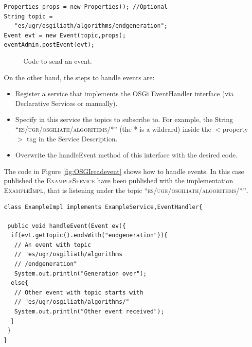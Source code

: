 \newsavebox{\mintedboxOSGIpostevent}
\begin{lrbox}{\mintedboxOSGIpostevent}
\begin{minipage}{10cm}
\begin{verbatim}
Properties props = new Properties(); //Optional
String topic = 
   "es/ugr/osgiliath/algorithms/endgeneration";
Event evt = new Event(topic,props);
eventAdmin.postEvent(evt);
\end{verbatim}
\end{minipage}
\end{lrbox}

\begin{figure}
\usebox{\mintedboxOSGIpostevent}
\caption{Code to send an event.}
\label{fig:OSGIpostevent} 
\end{figure}
		
On the other hand, the steps to handle events are:
\begin{itemize}
\item Register a service that implements the OSGi EventHandler interface (via Declarative Services or manually).
\item Specify in this service the topics to subscribe to. For example, the String \textsc{ ``es/ugr/osgiliath/algorithms/*''} (the * is a wildcard) inside the $<$property$>$ tag in the Service Description.
\item Overwrite the handleEvent method of this interface with the desired code.
\end{itemize}

The code  in Figure \ref{fig:OSGIreadevent} shows how to handle events. In this case published the \textsc{ ExampleService} have been published with the implementation \textsc{ ExampleImpl}, that is listening under the topic \textsc{ ``es/ugr/osgiliath/algorithms/*''}.



\newsavebox{\mintedboxOSGIreadevent}
\begin{lrbox}{\mintedboxOSGIreadevent}
\begin{minipage}{10cm}
\begin{verbatim}
class ExampleImpl implements ExampleService,EventHandler{

 public void handleEvent(Event ev){
  if(evt.getTopic().endsWith("endgeneration")){
   // An event with topic 
   // "es/ugr/osgiliath/algorithms
   // /endgeneration"
   System.out.println("Generation over");
  else{
   // Other event with topic starts with
   // "es/ugr/osgiliath/algorithms/"
   System.out.println("Other event received");
  }
 }
}
\end{verbatim}
\end{minipage}
\end{lrbox}

